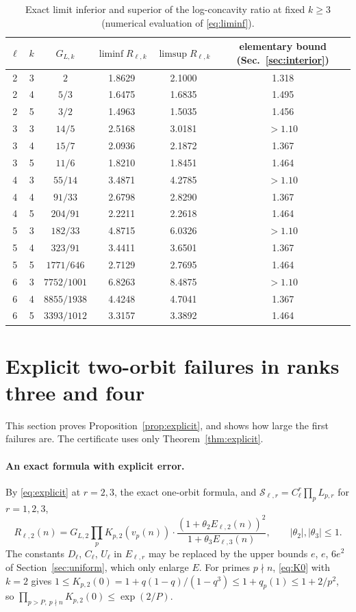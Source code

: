 \documentclass[11pt,a4paper]{article}
\theoremstyle{remark}
\numberwithin{equation}{section}
\newcommand{\Sing}{\mathcal S}
\begin{document}
\begin{table}[ht]
\centering\small
\begin{tabular}{@{}cccccc@{}}
\toprule
$\ell$ & $k$ & $G_{L,k}$ & $\liminf R_{\ell,k}$ & $\limsup R_{\ell,k}$ & elementary bound (Sec.~\ref{sec:interior})\\
\midrule
2 & 3 & $2$ & 1.8629 & 2.1000 & 1.318\\
2 & 4 & $5/3$ & 1.6475 & 1.6835 & 1.495\\
2 & 5 & $3/2$ & 1.4963 & 1.5035 & 1.456\\
3 & 3 & $14/5$ & 2.5168 & 3.0181 & $>1.10$\\
3 & 4 & $15/7$ & 2.0936 & 2.1872 & 1.367\\
3 & 5 & $11/6$ & 1.8210 & 1.8451 & 1.464\\
4 & 3 & $55/14$ & 3.4871 & 4.2785 & $>1.10$\\
4 & 4 & $91/33$ & 2.6798 & 2.8290 & 1.367\\
4 & 5 & $204/91$ & 2.2211 & 2.2618 & 1.464\\
5 & 3 & $182/33$ & 4.8715 & 6.0326 & $>1.10$\\
5 & 4 & $323/91$ & 3.4411 & 3.6501 & 1.367\\
5 & 5 & $1771/646$ & 2.7129 & 2.7695 & 1.464\\
6 & 3 & $7752/1001$ & 6.8263 & 8.4875 & $>1.10$\\
6 & 4 & $8855/1938$ & 4.4248 & 4.7041 & 1.367\\
6 & 5 & $3393/1012$ & 3.3157 & 3.3892 & 1.464\\
\bottomrule
\end{tabular}
\caption{Exact limit inferior and superior of the log-concavity ratio at fixed $k\ge3$ (numerical evaluation of \eqref{eq:liminf}).}\label{tab:liminf}
\end{table}

\section{Explicit two-orbit failures in ranks three and four}\label{sec:explicit}

This section proves Proposition~\ref{prop:explicit}, and shows how large the first failures are. The certificate uses only Theorem~\ref{thm:explicit}.

\paragraph{An exact formula with explicit error.} By \eqref{eq:explicit} at $r=2,3$, the exact one-orbit formula, and $\Sing_{\ell,r}=C_\ell^r\prod_pL_{p,r}$ for $r=1,2,3$,
\begin{equation}\label{eq:Rcert}
R_{\ell,2}(n)=G_{L,2}\prod_pK_{p,2}(v_p(n))\cdot\frac{(1+\theta_2E_{\ell,2}(n))^2}{1+\theta_3E_{\ell,3}(n)},\qquad|\theta_2|,|\theta_3|\le1 .
\end{equation}
The constants $D_\ell$, $C_\ell$, $U_\ell$ in $E_{\ell,r}$ may be replaced by the upper bounds $e$, $e$, $6e^2$ of Section~\ref{sec:uniform}, which only enlarge $E$. For primes $p\nmid n$, \eqref{eq:K0} with $k=2$ gives $1\le K_{p,2}(0)=1+q(1-q)/(1-q^3)\le1+q_p(1)\le1+2/p^2$, so $\prod_{p>P,\ p\nmid n}K_{p,2}(0)\le\exp(2/P)$.
\end{document}
